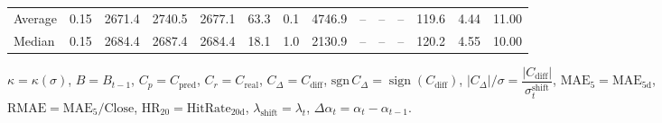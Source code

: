 \begin{threeparttable}
{\begin{tabular}{lrrrrrrrrrrrrr}
Average &     0.15 & 2671.4 & 2740.5 & 2677.1 &       63.3 &                      0.1 &              4746.9 &         -- &        -- &             -- &            119.6 &            4.44 &                  11.00 \\
 Median &     0.15 & 2684.4 & 2687.4 & 2684.4 &       18.1 &                      1.0 &              2130.9 &         -- &        -- &             -- &            120.2 &            4.55 &                  10.00 \\
\bottomrule
\end{tabular}
}
\begin{tablenotes}\footnotesize
\item $\kappa=\kappa(\sigma)$, $B=B_{t-1}$, $C_p=C_{\text{pred}}$, $C_r=C_{\text{real}}$, $C_\Delta=C_{\text{diff}}$, $\mathrm{sgn}\,C_\Delta=\operatorname{sign}(C_{\text{diff}})$, $|C_\Delta|/\sigma=\dfrac{|C_{\text{diff}}|}{\sigma_t^{\text{shift}}}$, $\mathrm{MAE}_5=\mathrm{MAE}_{5\text{d}}$, $\mathrm{RMAE}= \mathrm{MAE}_5 / \text{Close}$, $\mathrm{HR}_{20}=\mathrm{HitRate}_{20\text{d}}$, 
$\lambda_{\text{shift}}=\lambda_t$, 
$\Delta\alpha_t=\alpha_t-\alpha_{t-1}$.
\end{tablenotes}
\end{threeparttable}
\endgroup

